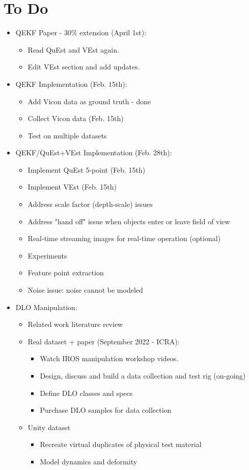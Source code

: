 \documentclass[11pt]{article}
\begin{document}
\section{To Do}
\begin{itemize}
  \item QEKF Paper - 30\% extension (April 1st):
  \begin{itemize}
      \item Read QuEst and VEst again.
      \item Edit VEst section and add updates.
  \end{itemize}
  \item QEKF Implementation (Feb. 15th):
  \begin{itemize}
      \item Add Vicon data as ground truth - done
      \item Collect Vicon data (Feb. 15th)
      \item Test on multiple datasets
  \end{itemize}
  \item QEKF/QuEst+VEst Implementation (Feb. 28th):
  \begin{itemize}
      \item Implement QuEst 5-point (Feb. 15th)
      \item Implement VEst (Feb. 15th)
      \item Address scale factor (depth-scale) issues
      \item Address "hand off" issue when objects enter or leave field of view
      \item Real-time streaming images for real-time operation (optional)
      \item Experiments
      \item Feature point extraction
      \item Noise issue: noise cannot be modeled
  \end{itemize}
  \item  DLO Manipulation:
  \begin{itemize}
      \item Related work literature review
      \item Real dataset + paper (September 2022 - ICRA):
      \begin{itemize}
            \item Watch IROS manipulation workshop videos.
            \item Design, discuss and build a data collection and test rig (on-going)
            \item Define DLO classes and specs
            \item Purchase DLO samples for data collection
      \end{itemize}
      \item Unity dataset
      \begin{itemize}
            \item Recreate virtual duplicates of physical test material
            \item Model dynamics and deformity
      \end{itemize}
  \end{itemize}
\end{itemize}
\end{document}
